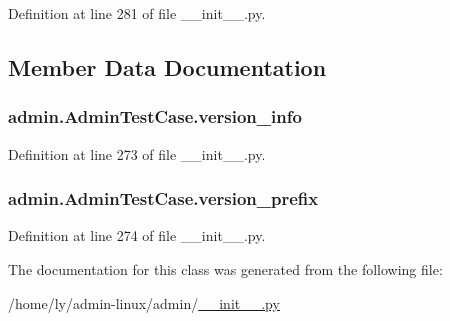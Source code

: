 Definition at line 281 of file \-\_\-\-\_\-init\-\_\-\-\_\-.\-py.



\subsection{Member Data Documentation}
\hypertarget{classadmin_1_1AdminTestCase_a235ad774d40bba3600cf09b79dc9f209}{
\subsubsection[{version\-\_\-info}]{\setlength{\rightskip}{0pt plus 5cm}admin.\-Admin\-Test\-Case.\-version\-\_\-info}}\label{classadmin_1_1AdminTestCase_a235ad774d40bba3600cf09b79dc9f209}


Definition at line 273 of file \-\_\-\-\_\-init\-\_\-\-\_\-.\-py.

\hypertarget{classadmin_1_1AdminTestCase_a6b12aab33be61651698f4b8810678168}{
\subsubsection[{version\-\_\-prefix}]{\setlength{\rightskip}{0pt plus 5cm}admin.\-Admin\-Test\-Case.\-version\-\_\-prefix}}\label{classadmin_1_1AdminTestCase_a6b12aab33be61651698f4b8810678168}


Definition at line 274 of file \-\_\-\-\_\-init\-\_\-\-\_\-.\-py.



The documentation for this class was generated from the following file\-:\begin{DoxyCompactItemize}
\item 
/home/ly/admin-\/linux/admin/\hyperlink{____init_____8py}{\-\_\-\-\_\-init\-\_\-\-\_\-.\-py}\end{DoxyCompactItemize}
